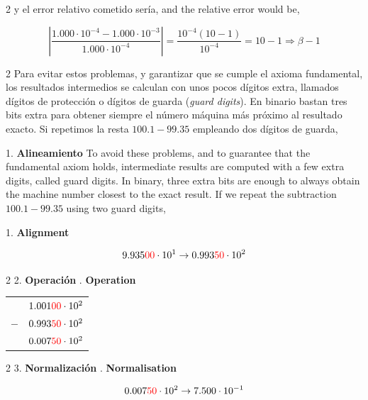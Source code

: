 \begin{paracol}{2}
y el error relativo cometido sería,
\switchcolumn
and the relative error would be,
\end{paracol}

\begin{equation*}
\left\vert\frac{1.000\cdot10^{-4}-1.000\cdot10^{-3}}{1.000\cdot10^{-4}}\right\vert=\frac{10^{-4}(10-1)}{10^{-4}}=10-1\Rightarrow\beta -1
\end{equation*}

\begin{paracol}{2}
Para evitar estos problemas, y garantizar que se cumple el axioma fundamental, los resultados intermedios se calculan con unos pocos dígitos extra, llamados dígitos de protección o dígitos de guarda (\emph{guard digits}). En binario bastan tres bits extra para obtener siempre el número máquina más próximo al resultado exacto. Si repetimos la resta $100.1-99.35$ empleando dos dígitos de guarda,

1. \textbf{Alineamiento}
\switchcolumn
{}To avoid these problems, and to guarantee that the fundamental axiom holds, intermediate results are computed with a few extra digits, called guard digits. In binary, three extra bits are enough to always obtain the machine number closest to the exact result. If we repeat the subtraction $100.1-99.35$ using two guard digits,

1. \textbf{Alignment}
\end{paracol}
\begin{equation*}
9.935{\color{red}00}\cdot10^1\rightarrow 0.993{\color{red}50} \cdot 10^2
\end{equation*}

\begin{paracol}{2}
2. \textbf{Operación}
. \textbf{Operation}
\end{paracol}
\begin{center}
\begin{tabular}{c r}
&$1.001{\color{red}00} \cdot10^2$\\
$-$&$0.993{\color{red}50}\cdot10^2$\\
\hline
&$0.007{\color{red}50}\cdot10^2$
\end{tabular}
\end{center}

\begin{paracol}{2}
3. \textbf{Normalización}
. \textbf{Normalisation}
\end{paracol}
\begin{equation*}
0.007{\color{red}50}\cdot10^2\rightarrow 7.500\cdot10^{-1}
\end{equation*}

